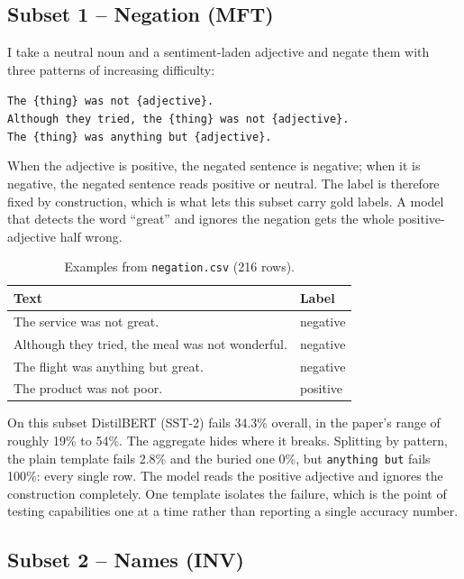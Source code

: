 \documentclass[11pt]{article}
\begin{document}
\subsection{Subset 1 -- Negation (MFT)}

I take a neutral noun and a sentiment-laden adjective and negate them with
three patterns of increasing difficulty:
\begin{center}
\texttt{The \{thing\} was not \{adjective\}.} \\
\texttt{Although they tried, the \{thing\} was not \{adjective\}.} \\
\texttt{The \{thing\} was anything but \{adjective\}.}
\end{center}
When the adjective is positive, the negated sentence is negative; when it is
negative, the negated sentence reads positive or neutral. The label is
therefore fixed by construction, which is what lets this subset carry gold
labels. A model that detects the word ``great'' and ignores the negation
gets the whole positive-adjective half wrong.

\begin{table}[h]
\centering
\begin{tabular}{ll}
\toprule
Text & Label \\
\midrule
The service was not great. & negative \\
Although they tried, the meal was not wonderful. & negative \\
The flight was anything but great. & negative \\
The product was not poor. & positive \\
\bottomrule
\end{tabular}
\caption{Examples from \texttt{negation.csv} (216 rows).}
\end{table}

On this subset DistilBERT (SST-2) fails 34.3\% overall, in the paper's range
of roughly 19\% to 54\%. The aggregate hides where it breaks. Splitting by
pattern, the plain template fails 2.8\% and the buried one 0\%, but
\texttt{anything but} fails 100\%: every single row. The model reads the
positive adjective and ignores the construction completely. One template
isolates the failure, which is the point of testing capabilities one at a
time rather than reporting a single accuracy number.

\subsection{Subset 2 -- Names (INV)}
\end{document}
